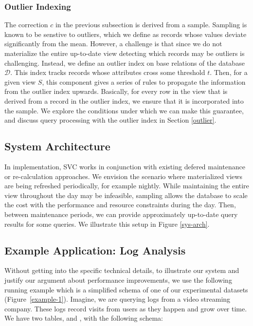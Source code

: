 \subsubsection{Outlier Indexing}
The correction $c$  in the previous subsection is derived from a sample.
Sampling is known to be senstive to outliers, which we define as records whose values deviate significantly from the mean.
However, a challenge is that since we do not materialize the entire up-to-date view detecting which records may be outliers is challenging.
Instead, we define an outlier index on base relations of the database $\mathcal{D}$.
This index tracks records whose attributes cross some threshold $t$.
Then, for a given view $S$, this component gives a series of rules to propagate the information from the outlier index upwards.
Basically, for every row in the view that is derived from a record in the outlier index, we ensure that it is incorporated into the sample.
We explore the conditions under which we can make this guarantee, and discuss query processing with the outlier index in Section \ref{outlier}.

\subsection{System Architecture}

In implementation, SVC works in conjunction with existing defered maintenance or re-calculation approaches.
We envision the scenario where materialized views are being refreshed periodically, for example nightly.
While maintaining the entire view throughout the day may be infeasible, sampling allows the database to scale the cost with the performance and resource constraints during the day.
Then, between maintenance periods, we can provide approximately up-to-date query results for some queries.
We illustrate this setup in Figure \ref{sys-arch}. 

\subsection{Example Application: Log Analysis}
Without getting into the specific technical details, to illustrate our system and justify our argument about performance improvements, we use the following running example which is a 
simplified schema of one of our experimental datasets (Figure~\ref{example-1}).
Imagine, we are querying logs from a video streaming company. 
These logs record visits from users as they happen and grow over time.
We have two tables,  and , with the following schema:

